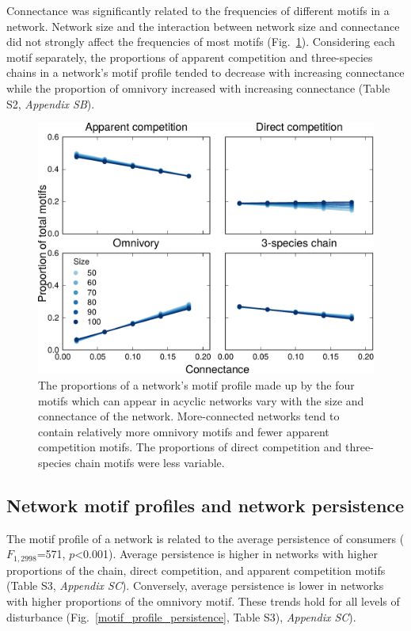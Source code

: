\documentclass[12pt]{article}
\begin{document}
\begin{spacing}{2.0}
        Connectance was significantly related to the frequencies of different motifs in a network.
        Network size and the interaction between network size and connectance did not strongly affect the frequencies of most motifs (Fig.~\ref{motif_proportion_lms}).
        Considering each motif separately, the proportions of apparent competition and three-species chains in a network's motif profile tended to decrease with increasing connectance while the proportion of omnivory increased with increasing connectance (Table S2, \emph{Appendix SB}). 
    
        \begin{figure}[h!]
            \centering
            \includegraphics[width=.75\textwidth]{manuscript/figures/motif_proportion_lms.pdf}
            \caption{The proportions of a network's motif profile made up by the four motifs which can appear in acyclic networks vary with the size and connectance of the network. More-connected networks tend to contain relatively more omnivory motifs and fewer apparent competition motifs. The proportions of direct competition and three-species chain motifs were less variable.}
            \label{motif_proportion_lms}
        \end{figure}

    \clearpage

    \subsection*{Network motif profiles and network persistence}
    
        The motif profile of a network is related to the average persistence of consumers ($F_{1,2998}$=571, $p$\textless0.001). Average persistence is higher in networks with higher proportions of the chain, direct competition, and apparent competition motifs (Table S3, \emph{Appendix SC}). Conversely, average persistence is lower in networks with higher proportions of the omnivory motif. These trends hold for all levels of disturbance (Fig.~\ref{motif_profile_persistence}, Table S3), \emph{Appendix SC}).%


\end{spacing}
\end{document}
